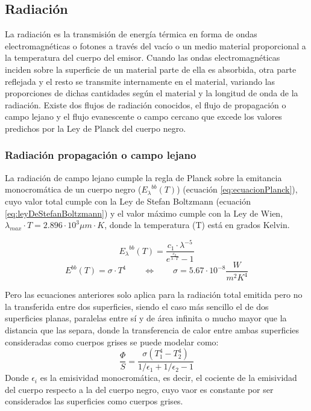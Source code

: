 \subsection{Radiación}
La radiación es la transmisión de energía térmica en forma de ondas electromagnéticas o fotones a través del vacío o un medio material proporcional a la temperatura del cuerpo del emisor. Cuando las ondas electromagnéticas inciden sobre la superficie de un material parte de ella es absorbida, otra parte reflejada y el resto se transmite internamente en el material, variando las proporciones de dichas cantidades según el material y la longitud de onda de la radiación. Existe dos flujos de radiación conocidos, el flujo de propagación o campo lejano y el flujo evanescente o campo cercano que excede los valores predichos por la Ley de Planck del cuerpo negro.\\

\subsubsection{Radiación propagación o campo lejano}
La radiación de campo lejano cumple la regla de Planck sobre la emitancia monocromática de un cuerpo negro (${E_{\lambda}}^{bb}(T)$) (ecuación \ref{eq:ecuacionPlanck}), cuyo valor total cumple con la Ley de Stefan Boltzmann (ecuación \ref{eq:leyDeStefanBoltzmann}) y el valor máximo cumple con la Ley de Wien, $\lambda_{max}\cdot T=2.896\cdot 10^3 \mu m\cdot K$, donde la temperatura (T) está en grados Kelvin.

\begin{equation}
{E_\lambda}^{bb}\left( T \right) = \dfrac{c_1\cdot \lambda^{-5}}{e^{\frac{c_2}{\lambda \cdot T}}-1}
\label{eq:ecuacionPlanck}
\end{equation}
\begin{equation}
{E}^{bb}\left( T \right)=\sigma \cdot T^4 \qquad \Longleftrightarrow \qquad \sigma = 5.67\cdot 10^{-8} \dfrac{W}{m^2 K^4}
\label{eq:leyDeStefanBoltzmann}
\end{equation}

 Pero las ecuaciones anteriores solo aplica para la radiación total emitida pero no la transferida entre dos superficies, siendo el caso más sencillo el de dos superficies planas, paralelas entre sí y de área infinita o mucho mayor que la distancia que las separa, donde la transferencia de calor entre ambas superficies consideradas como cuerpos grises se puede modelar como:
\begin{equation}
\frac{\Phi}{S}=\frac{\sigma \left( T_1^4 -T_2^4 \right)}{1/\epsilon_1 +1/\epsilon_2 -1}
\label{eq:flujoCalorSuperficiesGrises}
\end{equation}
Donde $\epsilon_i$ es la emisividad monocromática, es decir, el cociente de la emisividad del cuerpo respecto a la del cuerpo negro, cuyo vaor es constante por ser considerados las superficies como cuerpos grises.\\

